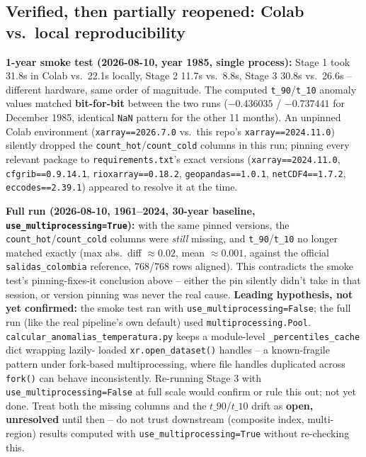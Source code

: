 \documentclass[11pt]{article}
\begin{document}
\subsection{Verified, then partially reopened: Colab vs.\ local
reproducibility}
\label{sec:reproducibility}

\textbf{1-year smoke test (2026-08-10, year 1985, single process):}
Stage 1 took 31.8s in Colab vs.\ 22.1s locally, Stage 2 11.7s vs.\ 8.8s,
Stage 3 30.8s vs.\ 26.6s -- different hardware, same order of magnitude.
The computed \texttt{t\_90}/\texttt{t\_10} anomaly values matched
\textbf{bit-for-bit} between the two runs ($-0.436035$ / $-0.737441$ for
December 1985, identical \texttt{NaN} pattern for the other 11 months).
An unpinned Colab environment (\texttt{xarray==2026.7.0} vs.\ this repo's
\texttt{xarray==2024.11.0}) silently dropped the
\texttt{count\_hot}/\texttt{count\_cold} columns in this run; pinning
every relevant package to \texttt{requirements.txt}'s exact versions
(\texttt{xarray==2024.11.0}, \texttt{cfgrib==0.9.14.1},
\texttt{rioxarray==0.18.2}, \texttt{geopandas==1.0.1},
\texttt{netCDF4==1.7.2}, \texttt{eccodes==2.39.1}) appeared to resolve it
at the time.

\textbf{Full run (2026-08-10, 1961--2024, 30-year baseline,
\texttt{use\_multiprocessing=True}):} with the same pinned versions, the
\texttt{count\_hot}/\texttt{count\_cold} columns were \emph{still}
missing, and \texttt{t\_90}/\texttt{t\_10} no longer matched exactly
(max abs.\ diff $\approx 0.02$, mean $\approx 0.001$, against the official
\texttt{salidas\_colombia} reference, 768/768 rows aligned). This
contradicts the smoke test's pinning-fixes-it conclusion above -- either
the pin silently didn't take in that session, or version pinning was
never the real cause. \textbf{Leading hypothesis, not yet confirmed:} the
smoke test ran with \texttt{use\_multiprocessing=False}; the full run
(like the real pipeline's own default) used
\texttt{multiprocessing.Pool}. \texttt{calcular\_anomalias\_temperatura.py}
keeps a module-level \texttt{\_percentiles\_cache} dict wrapping lazily-
loaded \texttt{xr.open\_dataset()} handles -- a known-fragile pattern
under fork-based multiprocessing, where file handles duplicated across
\texttt{fork()} can behave inconsistently. Re-running Stage 3 with
\texttt{use\_multiprocessing=False} at full scale would confirm or rule
this out; not yet done. Treat both the missing columns and the
$t\_90$/$t\_10$ drift as \textbf{open, unresolved} until then -- do not
trust downstream (composite index, multi-region) results computed with
\texttt{use\_multiprocessing=True} without re-checking this.
\end{document}
